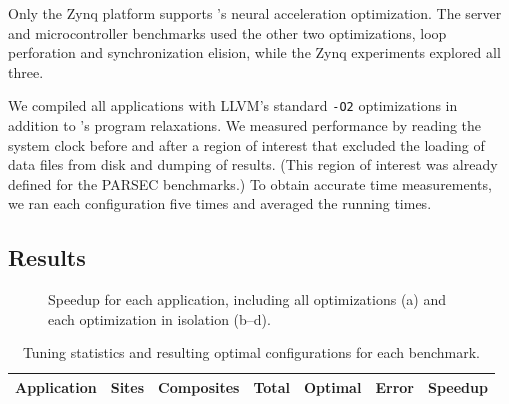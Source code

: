 Only the Zynq platform supports \sysname's neural acceleration optimization.
The server and microcontroller benchmarks used the other two optimizations,
loop perforation and synchronization elision, while the Zynq experiments
explored all three.

We compiled all applications with LLVM's standard \texttt{-O2} optimizations
in addition to \sysname's program relaxations.
%
We measured performance by reading the system clock before and after a
region of interest that excluded the
loading of data files from disk and dumping of results. (This region of
interest was already defined for the PARSEC benchmarks.)
To obtain accurate time measurements, we ran each configuration five times and
averaged the running times.


\subsection{Results}
\label{accept:sec:results}

\begin{figure}[t]
\centering
{}
\caption{Speedup for each application, including all
optimizations (a) and each optimization in isolation (b--d).}
\label{accept:fig:performance}
\end{figure}

\begin{table}
\centering
\footnotesize
\begin{tabular}{l r r r r r r}
\toprule
Application & Sites & Composites & Total & Optimal & Error & Speedup \\
\midrule

\bottomrule
\end{tabular}
\caption{Tuning statistics and resulting optimal configurations for each benchmark.}
\label{accept:table:stats}
\end{table}

